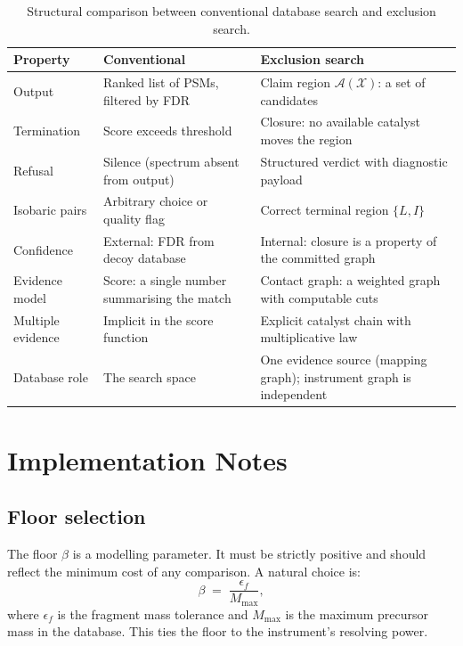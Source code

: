 \documentclass[11pt,a4paper]{article}
\theoremstyle{definition}
\theoremstyle{remark}
\newcommand{\flo}{\beta}
\newcommand{\amb}{\mathcal{A}}
\newcommand{\Spec}{\mathcal{X}}
\begin{document}
\begin{table}[t]
\centering
\small
\caption{Structural comparison between conventional database search and
exclusion search.}
\label{tab:compare}
\begin{tabular}{@{}p{}p{}p{}@{}}
\toprule
\textbf{Property} & \textbf{Conventional} & \textbf{Exclusion search} \\
\midrule
Output & Ranked list of PSMs, filtered by FDR & Claim region
$\amb(\Spec)$: a set of candidates \\[3pt]
Termination & Score exceeds threshold & Closure: no available catalyst
moves the region \\[3pt]
Refusal & Silence (spectrum absent from output) & Structured verdict
with diagnostic payload \\[3pt]
Isobaric pairs & Arbitrary choice or quality flag & Correct terminal
region $\{L,I\}$ \\[3pt]
Confidence & External: FDR from decoy database & Internal: closure is
a property of the committed graph \\[3pt]
Evidence model & Score: a single number summarising the match &
Contact graph: a weighted graph with computable cuts \\[3pt]
Multiple evidence & Implicit in the score function & Explicit
catalyst chain with multiplicative law \\[3pt]
Database role & The search space & One evidence source (mapping graph);
instrument graph is independent \\
\bottomrule
\end{tabular}
\end{table}

\section{Implementation Notes}
\label{sec:implementation}

\subsection{Floor selection}

The floor $\flo$ is a modelling parameter. It must be strictly positive
and should reflect the minimum cost of any comparison. A natural choice
is:
\[
  \flo \;=\; \frac{\epsilon_f}{M_{\max}},
\]
where $\epsilon_f$ is the fragment mass tolerance and $M_{\max}$ is the
maximum precursor mass in the database. This ties the floor to the
instrument's resolving power.
\end{document}
